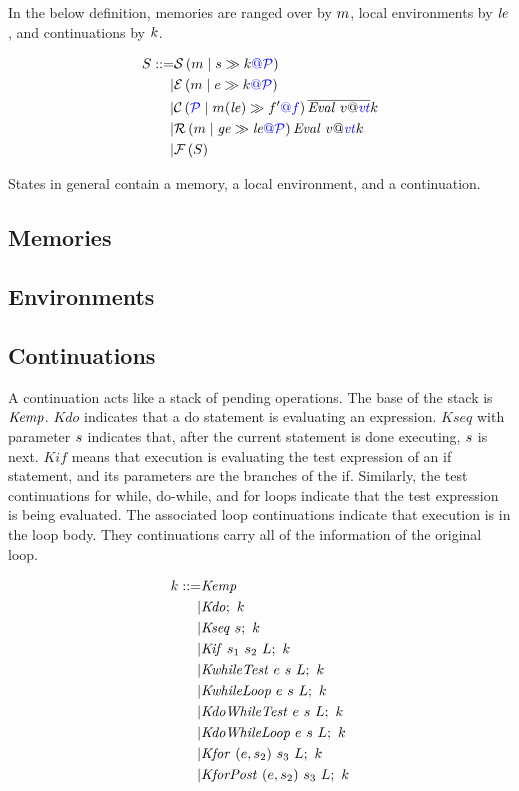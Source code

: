 \documentclass{llncs}
\begin{document}
In the below definition, memories are ranged over by \(\mem\), local environments by
\(\lenv\), and continuations by \(\cont\).

\[\begin{aligned}
S ::= & \sstate{\PCT}{\mem}{\stmt}{\cont} \\
| & \estate{\PCT}{\mem}{\expr}{\cont} \\
| & \cstate{f}{\PCT}{\mem}{\lenv}{f'}{\overline{\val{v}{\vt}}}{\cont} \\
| & \rstate{\PCT}{\mem}{\genv}{\lenv}{\val{v}{\vt}}{\cont} \\
| & \fstate{S} \\
\end{aligned}\]


States in general contain a memory, a local environment, and a continuation.

\subsection{Memories}

\subsection{Environments}

\subsection{Continuations}
\label{app:continuations}

A continuation acts like a stack of pending operations. The base of the stack is
\(\kemp\). \(\mathit{Kdo}\) indicates that a do statement is evaluating an expression.
\(\mathit{Kseq}\) with parameter \(\stmt\) indicates that, after the current statement
is done executing, \(\stmt\) is next. \(\mathit{Kif}\) means that execution is evaluating
the test expression of an if statement, and its parameters are the branches of the
if. Similarly, the test continuations for while, do-while, and for loops indicate that
the test expression is being evaluated. The associated loop continuations indicate that
execution is in the loop body. They continuations carry all of the information of the original
loop.

\[\begin{split}
\cont ::= & \kemp \\
| & \kdo{\cont} \\
| & \kseq{\stmt}{\cont} \\
| & \kif{\stmt_1}{\stmt_2}{L}{\cont} \\
| & \kwhiletest{\expr}{\stmt}{L}{\cont} \\
| & \kwhileloop{\expr}{\stmt}{L}{\cont} \\
| & \kdowhiletest{\expr}{\stmt}{L}{\cont} \\
| & \kdowhileloop{\expr}{\stmt}{L}{\cont} \\
| & \kfor{\expr}{\stmt_2}{\stmt_3}{L}{\cont} \\
| & \kforpost{\expr}{\stmt_2}{\stmt_3}{L}{\cont} \\
\end{split}\]
\end{document}
